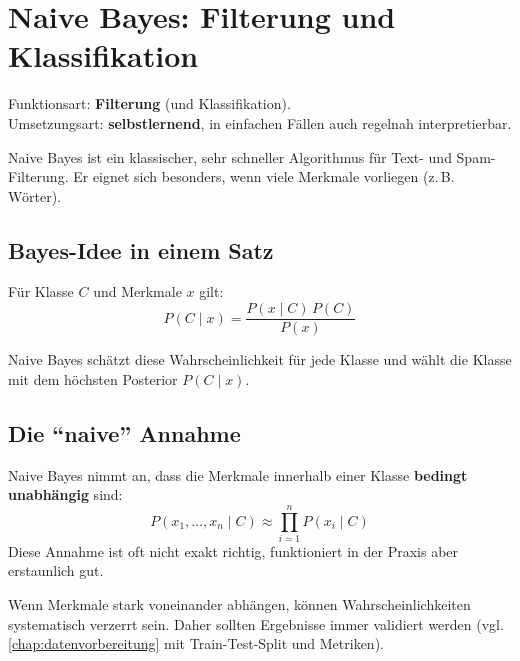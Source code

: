 \chapter{Naive Bayes: Filterung und Klassifikation}
\label{chap:naivebayes}

\begin{myremark}
    Funktionsart: \textbf{Filterung} (und Klassifikation). \\
    Umsetzungsart: \textbf{selbstlernend}, in einfachen Fällen auch regelnah interpretierbar.
\end{myremark}

\begin{myremark}
    Naive Bayes ist ein klassischer,
    sehr schneller Algorithmus für Text- und Spam-Filterung.
    Er eignet sich besonders, wenn viele Merkmale vorliegen (z.\,B. Wörter).
\end{myremark}

\section{Bayes-Idee in einem Satz}

\begin{mydefinition}
    Für Klasse $C$ und Merkmale $x$ gilt:
    \[
        P(C\mid x)=\frac{P(x\mid C)\,P(C)}{P(x)}
    \]

    Naive Bayes schätzt diese Wahrscheinlichkeit für jede Klasse und wählt
    die Klasse mit dem höchsten Posterior $P(C\mid x)$.
\end{mydefinition}

\section{Die \enquote{naive} Annahme}

\begin{mydefinition}
    Naive Bayes nimmt an, dass die Merkmale innerhalb einer Klasse
    \textbf{bedingt unabhängig} sind:
    \[
        P(x_1,\ldots,x_n\mid C) \approx \prod_{i=1}^n P(x_i\mid C)
    \]
    Diese Annahme ist oft nicht exakt richtig, funktioniert in der Praxis
    aber erstaunlich gut.
\end{mydefinition}

\begin{mycaution}
    Wenn Merkmale stark voneinander abhängen, können Wahrscheinlichkeiten
    systematisch verzerrt sein. Daher sollten Ergebnisse immer validiert werden
    (vgl. \cref{chap:datenvorbereitung} mit Train-Test-Split und Metriken).
\end{mycaution}


